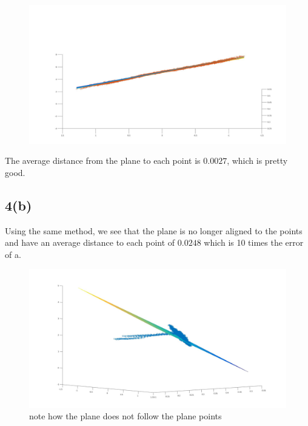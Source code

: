 \documentclass{article}
\begin{document}
\begin{figure}[H]
\centering
\includegraphics[width=5in]{figures/q4a_1-alt.jpg}
\end{figure}
The average distance from the plane to each point is $0.0027$, which is pretty good.

\subsection*{4(b)}
Using the same method, we see that the plane is no longer aligned to the points and have an average distance to each point of $0.0248$ which is 10 times the error of a.
\begin{figure}[H]
\centering
\includegraphics[width=5in]{figures/q4b.jpg}
\caption{note how the plane does not follow the plane points}
\end{figure}
\end{document}
